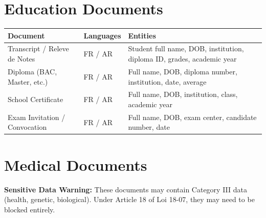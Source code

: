 \documentclass[11pt,a4paper]{article}
\begin{document}
\section{Education Documents}

\begin{longtable}{|p{4cm}|p{3cm}|p{8.5cm}|}
\hline
\textbf{Document} & \textbf{Languages} & \textbf{Entities} \\
\hline
\endhead

Transcript / Releve de Notes
&
FR / AR
&
Student full name, DOB, institution, diploma ID, grades, academic year
\\ \hline

Diploma (BAC, Master, etc.)
&
FR / AR
&
Full name, DOB, diploma number, institution, date, average
\\ \hline

School Certificate
&
FR / AR
&
Full name, DOB, institution, class, academic year
\\ \hline

Exam Invitation / Convocation
&
FR / AR
&
Full name, DOB, exam center, candidate number, date
\\ \hline

\end{longtable}

\section{Medical Documents}

\textbf{\textcolor{catIII}{Sensitive Data Warning:}} These documents may contain Category III data (health, genetic, biological). Under Article 18 of Loi 18-07, they may need to be blocked entirely.

\vspace{6pt}
\end{document}
